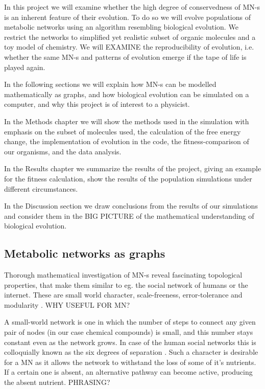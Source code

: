 \documentclass[a4paper,12pt]{article}
\begin{document}
	In this project we will examine whether the high degree of conservedness  of MN-s is an inherent feature of their evolution. To do so we will evolve populations of metabolic networks using an algorithm resembling biological evolution. We restrict the networks to simplified yet realistic subset of organic molecules and a toy model of chemistry. We will EXAMINE the reproducibility of evolution, i.e. whether the same MN-s and patterns of evolution emerge if the tape of life is played again. 

	In the following sections we will explain how MN-s can be modelled mathematically as graphs, and how biological evolution can be simulated on a computer, and why this project is of interest to a physicist.

	In the Methods chapter we  will show the methods used in the simulation with emphasis on the subset of molecules used, the calculation of the free energy change, the implementation of evolution in the code, the fitness-comparison of our organisms, and the data analysis. 

	In the Results chapter we summarize the results of the project, giving an example for the fitness calculation, show the results of the population simulations under different circumstances.


	In the Discussion section we draw conclusions from the results of our simulations and consider them in the BIG PICTURE of the mathematical understanding of biological evolution. 

	
	\subsection{Metabolic networks as graphs}
	Thorough mathematical investigation of MN-s reveal fascinating topological properties, that make them similar to eg. the social network of humans or the internet. These are small world character, scale-freeness, error-tolerance \cite{largescale} and modularity . WHY USEFUL FOR MN?
	
	A small-world network \cite{smallworld} is one in which the number of steps to connect any given pair of nodes (in our case chemical compounds) is small, and this number stays constant even as the network grows. In case of the human social networks this is colloquially known as the six degrees of separation \cite{sixdegrees}. Such a character is desirable for a MN as it allows the network to withstand the loss of some of it's nutrients. If a certain one is absent, an alternative pathway can become active, producing the absent nutrient. PHRASING? 
	 
\end{document}
